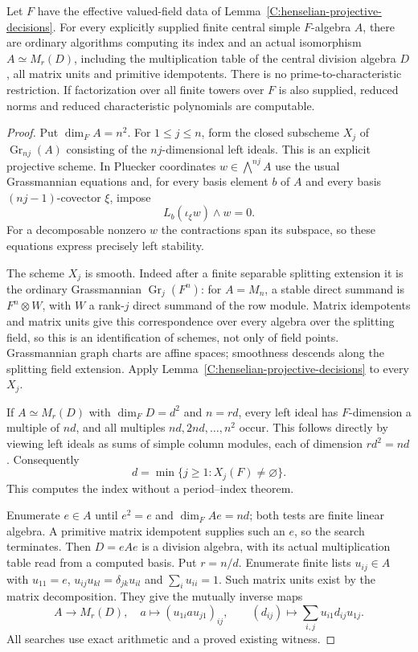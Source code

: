 \begin{theorem}
\label{C:henselian-central-simple-algorithms}
Let $F$ have the effective valued-field data of
Lemma~\ref{C:henselian-projective-decisions}.
For every explicitly supplied finite central simple $F$-algebra
$A$, there are ordinary algorithms computing its index and
an actual isomorphism $A\simeq M_r(D)$, including the
multiplication table of the central division algebra $D$,
all matrix units and primitive idempotents.
There is no prime-to-characteristic restriction.
If factorization over all finite towers over $F$ is also supplied,
reduced norms and reduced characteristic polynomials are computable.
\end{theorem}
\begin{proof}
Put $\dim_F A=n^2$. For $1\le j\le n$, form the closed
subscheme $X_j$ of $\operatorname{Gr}_{nj}(A)$ consisting
of the $nj$-dimensional left ideals.
This is an explicit projective scheme. In Pluecker coordinates
$w\in\bigwedge^{nj}A$ use the usual Grassmannian equations
and, for every basis element $b$ of $A$ and every basis
$(nj-1)$-covector $\xi$, impose
\[
             L_b(\iota_\xi w)\wedge w=0.             \tag{C.3.HP4}
\]
For a decomposable nonzero $w$ the contractions span its
subspace, so these equations express precisely left stability.

The scheme $X_j$ is smooth. Indeed after a finite separable
splitting extension it is the ordinary Grassmannian
$\operatorname{Gr}_j(F^n)$: for $A=M_n$, a stable direct
summand is $F^n\otimes W$, with $W$ a rank-$j$ direct summand
of the row module. Matrix idempotents and matrix units give
this correspondence over every algebra over the splitting field,
so this is an identification of schemes, not only of field points.
Grassmannian graph charts are affine spaces; smoothness descends
along the splitting field extension.
Apply Lemma~\ref{C:henselian-projective-decisions} to every $X_j$.

If $A\simeq M_r(D)$ with $\dim_FD=d^2$ and $n=rd$,
every left ideal has $F$-dimension a multiple of $nd$,
and all multiples $nd,2nd,\ldots,n^2$ occur.
This follows directly by viewing left ideals as sums of
simple column modules, each of dimension $rd^2=nd$.
Consequently
\[
       d=\min\{j\ge1:X_j(F)\ne\varnothing\}.          \tag{C.3.HP5}
\]
This computes the index without a period--index theorem.

Enumerate $e\in A$ until $e^2=e$ and
$\dim_F Ae=nd$; both tests are finite linear algebra.
A primitive matrix idempotent supplies such an $e$, so the
search terminates. Then $D=eAe$ is a division algebra, with
its actual multiplication table read from a computed basis.
Put $r=n/d$. Enumerate finite lists $u_{ij}\in A$ with
$u_{11}=e$, $u_{ij}u_{kl}=\delta_{jk}u_{il}$ and
$\sum_i u_{ii}=1$. Such matrix units exist by the matrix
decomposition. They give the mutually inverse maps
\[
 A\longrightarrow M_r(D),\quad
 a\longmapsto(u_{1i}au_{j1})_{ij},\qquad
 (d_{ij})\longmapsto\sum_{i,j}u_{i1}d_{ij}u_{1j}.
\]
All searches use exact arithmetic and a proved existing witness.


\end{proof}
